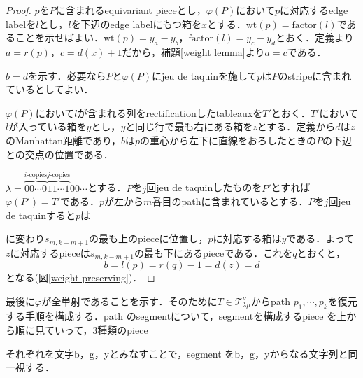 \begin{proof}
  $p$を$P$に含まれるequivariant pieceとし，$\varphi(P)$において$p$に対応するedge labelを$l$とし，$l$を下辺のedge labelにもつ箱を$x$とする．$\text{wt}(p)=\text{factor}(l)$であることを示せばよい．$\text{wt}(p) = y_a-y_b$，$\text{factor}(l)=y_c-y_d$とおく．定義より$a=r(p)$，$c=d(x)+1$だから，補題\ref{weight lemma}より$a=c$である．

  $b=d$を示す．必要なら$P$と$\varphi(P)$にjeu de taquinを施して$p$は$P$のstripeに含まれているとしてよい．
  
  $\varphi(P)$において$l$が含まれる列をrectificationしたtableauxを$T'$とおく．$T'$において$l$が入っている箱を$y$とし，$y$と同じ行で最も右にある箱を$z$とする．定義から$d$は$z$のManhattan距離であり，$b$は$p$の重心から左下に直線をおろしたときの$P$の下辺との交点の位置である．
  
  $\lambda = \overbrace{00\cdots0}^{i\text{-copies}}\overbrace{11\cdots1}^{j\text{-copies}}00\cdots$とする．$P$を$j$回jeu de taquinしたものを$P'$とすれば$\varphi(P')=T'$である．$p$が左から$m$番目のpathに含まれているとする．$P$を$j$回jeu de taquinすると$p$は
  に変わり$s_{m,k-m+1}$の最も上のpieceに位置し，$p$に対応する箱は$y$である．よって$z$に対応するpieceは$s_{m,k-m+1}$の最も下にあるpieceである．これを$q$とおくと，\[
  b = l(p) = r(q) - 1 = d(z) = d
  \]
  となる(図\ref{weight preserving})．

  
\end{proof}

最後に$\varphi$が全単射であることを示す．そのために$T\in\mathcal{T}^\nu_{\lambda\mu}$からpath $p_1,\cdots,p_k$を復元する手順を構成する．path のsegmentについて，segmentを構成するpiece を上から順に見ていって，$3$種類のpiece 
それぞれを文字b，g，yとみなすことで，segment をb，g，yからなる文字列と同一視する．

